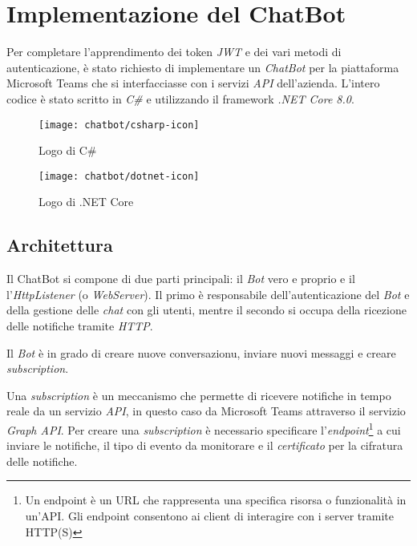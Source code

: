 \chapter{Implementazione del ChatBot}
\label{chatbot}

Per completare l'apprendimento dei token \emph{JWT} e dei vari metodi di autenticazione, è stato richiesto di implementare un \emph{ChatBot} per la piattaforma Microsoft Teams che si interfacciasse con i servizi \emph{API} dell'azienda.
L'intero codice è stato scritto in \emph{C\#} e utilizzando il framework \emph{.NET Core 8.0}.

\bigskip

\begin{figure}[!ht]
    \centering
    \begin{minipage}[t]{0.5\textwidth}
        \centering
        \texttt{[image: chatbot/csharp-icon]}
        \caption{Logo di C\#}
    \end{minipage}\hfill
    \begin{minipage}[t]{0.5\textwidth}
        \centering
        \texttt{[image: chatbot/dotnet-icon]}
        \caption{Logo di .NET Core}
    \end{minipage}
\end{figure}

\section{Architettura}

Il ChatBot si compone di due parti principali: il \emph{Bot} vero e proprio e il l'\emph{HttpListener} (o \emph{WebServer}). 
Il primo è responsabile dell'autenticazione del \emph{Bot} e della gestione delle \emph{chat} con gli utenti, mentre il secondo si occupa della ricezione delle notifiche tramite \emph{HTTP}.

Il \emph{Bot} è in grado di creare nuove conversazionu, inviare nuovi messaggi e creare \emph{subscription}.

Una \emph{subscription} è un meccanismo che permette di ricevere notifiche in tempo reale da un servizio \emph{API}, in questo caso da Microsoft Teams attraverso il servizio \emph{Graph API}.
Per creare una \emph{subscription} è necessario specificare l'\emph{endpoint}\footnote{Un endpoint è un URL che rappresenta una specifica risorsa o funzionalità in un'API. Gli endpoint consentono ai client di interagire con i server tramite HTTP(S)} a cui inviare le notifiche, il tipo di evento da monitorare e il \emph{certificato} per la cifratura delle notifiche.

